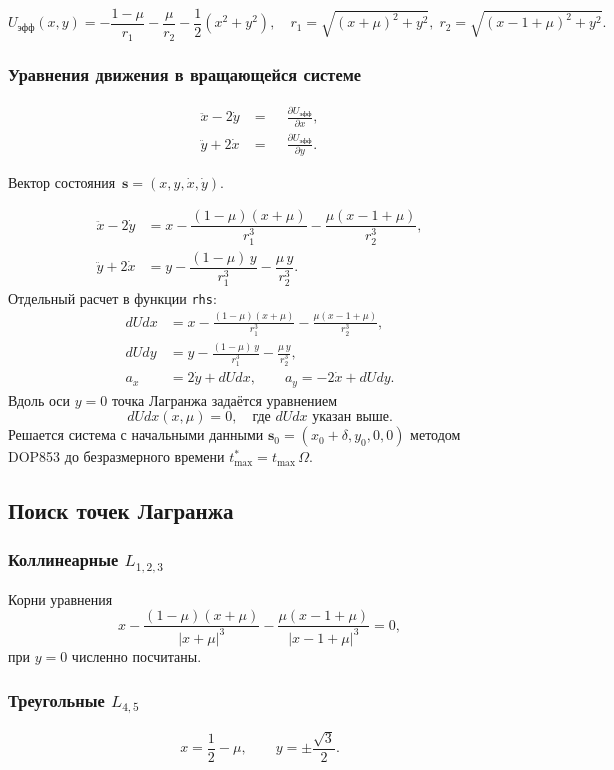 \documentclass[12pt]{article}
\begin{document}
\[
U_{\mathrm{эфф}}(x,y)=
-\frac{1-\mu}{r_1}-\frac{\mu}{r_2}-\frac12(x^2+y^2),
\quad
r_1=\sqrt{(x+\mu)^2+y^2},\;
r_2=\sqrt{(x-1+\mu)^2+y^2}.
\]

\subsubsection{Уравнения движения в вращающейся системе}

\[
\begin{aligned}
\ddot x - 2\dot y &= \phantom{-}\frac{\partial U_{\mathrm{эфф}}}{\partial x},\\
\ddot y + 2\dot x &= \phantom{-}\frac{\partial U_{\mathrm{эфф}}}{\partial y}.
\end{aligned}
\tag{1}
\]

Вектор состояния\
\(\mathbf s=(x,y,\dot x,\dot y)\).

\[
\boxed{
\begin{aligned}
\ddot x-2\dot y &=
  x-\dfrac{(1-\mu)(x+\mu)}{r_1^{3}}
    -\dfrac{\mu(x-1+\mu)}{r_2^{3}},\\[6pt]
\ddot y+2\dot x &=
  y-\dfrac{(1-\mu)\,y}{r_1^{3}}
    -\dfrac{\mu\,y}{r_2^{3}}.
\end{aligned}}
\tag{EOM}
\]
Отдельный расчет в функции \texttt{rhs}:
\begin{align*}
dUdx &= x-\frac{(1-\mu)(x+\mu)}{r_1^{3}}
           -\frac{\mu(x-1+\mu)}{r_2^{3}},\\
dUdy &= y-\frac{(1-\mu)\,y}{r_1^{3}}
           -\frac{\mu\,y}{r_2^{3}},\\
a_x &=  2\dot y + dUdx,\qquad
a_y = -2\dot x + dUdy.
\end{align*}
Вдоль оси $y=0$ точка Лагранжа задаётся уравнением  
\[
dUdx(x,\mu)=0,
\quad\text{где }dUdx \text{ указан выше}.
\]
Решается система с начальными данными  
\(\mathbf s_0=(x_0+\delta,y_0,0,0)\)
методом DOP853 до безразмерного времени
\(t_{\max}^{*}=t_{\max}\,\Omega\).

\subsection{Поиск точек Лагранжа}

\subsubsection{Коллинеарные $L_{1,2,3}$}
Корни уравнения
\[
x-\frac{(1-\mu)(x+\mu)}{|x+\mu|^{3}}
 -\frac{\mu(x-1+\mu)}{|x-1+\mu|^{3}}=0,
\]
при $y=0$ численно посчитаны.
\subsubsection{Треугольные $L_{4,5}$}
\[
x=\frac12-\mu,\qquad
y=\pm\frac{\sqrt3}{2}.
\]
\end{document}
